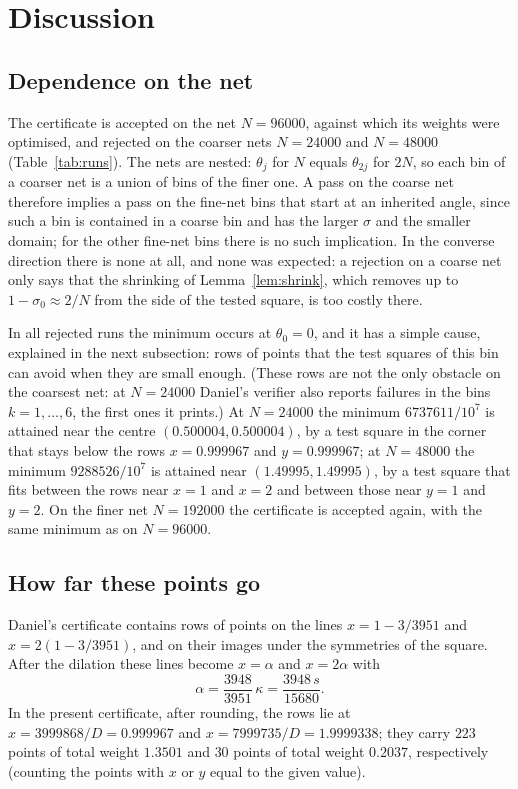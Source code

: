 \documentclass[11pt]{amsart}
\theoremstyle{definition}
\theoremstyle{remark}
\begin{document}
\section{Discussion}\label{sec:discussion}

\subsection{Dependence on the net}\label{sec:nets}
The certificate is accepted on the net $N=96000$, against which its weights were optimised, and rejected on the coarser nets $N=24000$ and $N=48000$ (Table~\ref{tab:runs}). The nets are nested: $\theta_j$ for $N$ equals $\theta_{2j}$ for $2N$, so each bin of a coarser net is a union of bins of the finer one. A pass on the coarse net therefore implies a pass on the fine-net bins that start at an inherited angle, since such a bin is contained in a coarse bin and has the larger $\sigma$ and the smaller domain; for the other fine-net bins there is no such implication. In the converse direction there is none at all, and none was expected: a rejection on a coarse net only says that the shrinking of Lemma~\ref{lem:shrink}, which removes up to $1-\sigma_0\approx2/N$ from the side of the tested square, is too costly there.

In all rejected runs the minimum occurs at $\theta_0=0$, and it has a simple cause, explained in the next subsection: rows of points that the test squares of this bin can avoid when they are small enough. (These rows are not the only obstacle on the coarsest net: at $N=24000$ Daniel's verifier also reports failures in the bins $k=1,\dots,6$, the first ones it prints.) At $N=24000$ the minimum $6737611/10^7$ is attained near the centre $(0.500004,0.500004)$, by a test square in the corner that stays below the rows $x=0.999967$ and $y=0.999967$; at $N=48000$ the minimum $9288526/10^7$ is attained near $(1.49995,1.49995)$, by a test square that fits between the rows near $x=1$ and $x=2$ and between those near $y=1$ and $y=2$. On the finer net $N=192000$ the certificate is accepted again, with the same minimum as on $N=96000$.

\subsection{How far these points go}\label{sec:rows}
Daniel's certificate contains rows of points on the lines $x=1-3/3951$ and $x=2(1-3/3951)$, and on their images under the symmetries of the square. After the dilation these lines become $x=\alpha$ and $x=2\alpha$ with
\[
  \alpha=\frac{3948}{3951}\,\kappa=\frac{3948\,s}{15680}.
\]
In the present certificate, after rounding, the rows lie at $x=3999868/D=0.999967$ and $x=7999735/D=1.9999338$; they carry $223$ points of total weight $1.3501$ and $30$ points of total weight $0.2037$, respectively (counting the points with $x$ or $y$ equal to the given value).
\end{document}
